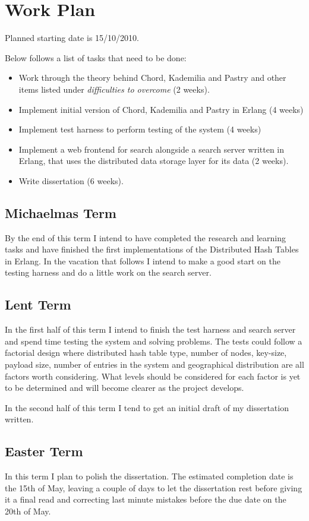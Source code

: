 \section*{Work Plan}

Planned starting date is 15/10/2010. 

Below follows a list of tasks that need to be done:

\begin{itemize}
  \item Work through the theory behind Chord, Kademilia and Pastry and other items listed under \emph{difficulties to overcome} (2 weeks).
  \item Implement initial version of Chord, Kademilia and Pastry in Erlang (4 weeks)
  \item Implement test harness to perform testing of the system (4 weeks)
  \item Implement a web frontend for search alongside a search server written in Erlang, that uses the distributed data storage layer for its data (2 weeks).
  \item Write dissertation (6 weeks).
\end{itemize}

\subsection*{Michaelmas Term} 

By the end of this term I intend to have completed the research and learning tasks and have finished the first implementations of the Distributed Hash Tables in Erlang. In the vacation that follows I intend to make a good start on the testing harness and do a little work on the search server.


\subsection*{Lent Term}

In the first half of this term I intend to finish the test harness and search server and spend time testing the system and solving problems. The tests could follow a factorial design where distributed hash table type, number of nodes, key-size, payload size, number of entries in the system and geographical distribution are all factors worth considering. What levels should be considered for each factor is yet to be determined and will become clearer as the project develops.

In the second half of this term I tend to get an initial draft of my dissertation written.


\subsection*{Easter Term}

In this term I plan to polish the dissertation. The estimated completion date is the 15th of May, leaving a couple of days to let the dissertation rest before giving it a final read and correcting last minute mistakes before the due date on the 20th of May.
